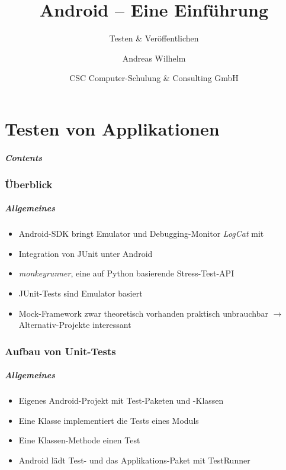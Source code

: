 \title{Android -- Eine Einführung}
\subtitle{Testen \& Veröffentlichen}
\author[A. Wilhelm]{Andreas Wilhelm}
\titlegraphic{}
\date{CSC Computer-Schulung \& Consulting GmbH}

\begin{frame}[plain]
  \titlepage
\end{frame}

\part{Testen von Applikationen}
\frame{\partpage}
\begin{frame}
	\frametitle{Contents}
	\tableofcontents[]
\end{frame}

\section{Überblick}
\begin{frame}
	\frametitle{Allgemeines}
	\begin{itemize}
		\item Android-SDK bringt Emulator und Debugging-Monitor \emph{LogCat} 
			mit
		\item Integration von JUnit unter Android
		\item \emph{monkeyrunner}, eine auf Python basierende Stress-Test-API
		\item JUnit-Tests sind Emulator basiert
		\item Mock-Framework zwar theoretisch vorhanden praktisch unbrauchbar
			$\rightarrow$ Alternativ-Projekte interessant
	\end{itemize}
\end{frame}

\section{Aufbau von Unit-Tests}
\begin{frame}
	\frametitle{Allgemeines}
	\begin{itemize}
		\item Eigenes Android-Projekt mit Test-Paketen und -Klassen
		\item Eine Klasse implementiert die Tests eines Moduls
		\item Eine Klassen-Methode einen Test
		\item Android lädt Test- und das Applikations-Paket mit TestRunner
	\end{itemize}
\end{frame}

